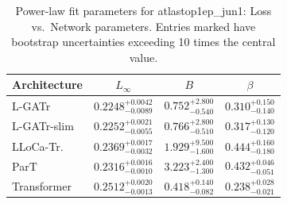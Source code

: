 \begin{table}[h]
  \centering
  \begin{tabular}{lccc}
    \toprule
    Architecture & $L_\infty$ & $B$ & $\beta$ \\
    \midrule
    L-GATr & $0.2248^{+0.0042}_{-0.0089}$ & $0.752^{+2.800}_{-0.540}$ & $0.310^{+0.150}_{-0.140}$ \\
    L-GATr-slim & $0.2252^{+0.0021}_{-0.0055}$ & $0.766^{+2.800}_{-0.510}$ & $0.317^{+0.130}_{-0.120}$ \\
    LLoCa-Tr. & $0.2369^{+0.0017}_{-0.0032}$ & $1.929^{+9.500}_{-1.600}$ & $0.444^{+0.160}_{-0.180}$ \\
    ParT & $0.2316^{+0.0016}_{-0.0010}$ & $3.223^{+2.400}_{-1.300}$ & $0.432^{+0.046}_{-0.051}$ \\
    Transformer & $0.2512^{+0.0020}_{-0.0013}$ & $0.418^{+0.140}_{-0.082}$ & $0.238^{+0.028}_{-0.021}$ \\
    \bottomrule
  \end{tabular}
  \caption{Power-law fit parameters for atlastop1ep\_jun1: Loss vs.\ Network parameters. Entries marked \textemdash{} have bootstrap uncertainties exceeding 10 times the central value.}
  \label{tab:atlastop1ep_jun1}
\end{table}
